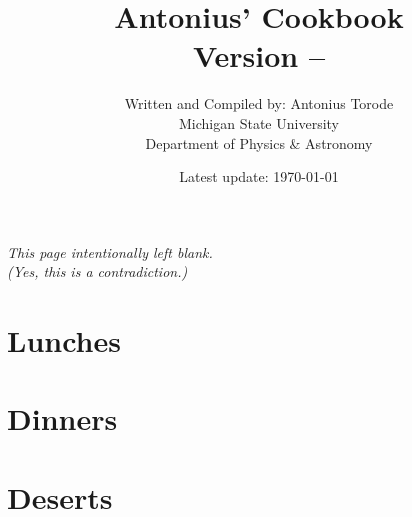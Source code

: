 \documentclass[a5paper,11pt]{book}
\title{{\huge \textbf{Antonius' Cookbook} \\ \textbf{Version -- \Version}} \\ \vspace{1cm}
}
\author{Written and Compiled by: Antonius Torode \\ Michigan State University \\ Department of Physics \& Astronomy}
\date{Latest update: \today}
\begin{document}
	
\AddToShipoutPicture*{\CoverPic}

\setlength{\parindent}{0pt}
\frontmatter
\clearpage
\maketitle

\tableofcontents
\newpage
\vspace*{\fill}
\begin{center}
	\textit{This page intentionally left blank. \\ (Yes, this is a contradiction.)}
\end{center}
\vspace*{\fill}

\mainmatter
\pagestyle{fancy}



\chapter{Lunches}



\chapter{Dinners}


\chapter{Deserts}



\backmatter
\end{document}
